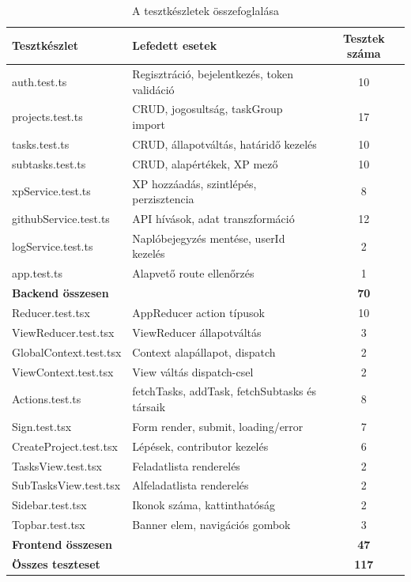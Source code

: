 \begin{table}[h!]
\centering
\caption{A tesztkészletek összefoglalása \cite{jest, vitest}}
\label{tab:test-summary}
\small
\begin{tabularx}{\textwidth}{|l|Y|c|}
\hline
\textbf{Tesztkészlet} & \textbf{Lefedett esetek} & \textbf{Tesztek száma} \\
\hline
auth.test.ts & Regisztráció, bejelentkezés, token validáció & 10 \\
projects.test.ts & CRUD, jogosultság, taskGroup import & 17 \\
tasks.test.ts & CRUD, állapotváltás, határidő kezelés & 10 \\
subtasks.test.ts & CRUD, alapértékek, XP mező & 10 \\
xpService.test.ts & XP hozzáadás, szintlépés, perzisztencia & 8 \\
githubService.test.ts & API hívások, adat transzformáció & 12 \\
logService.test.ts & Naplóbejegyzés mentése, userId kezelés & 2 \\
app.test.ts & Alapvető route ellenőrzés & 1 \\
\hline
\textbf{Backend összesen} & & \textbf{70} \\
\hline
Reducer.test.tsx & AppReducer action típusok & 10 \\
ViewReducer.test.tsx & ViewReducer állapotváltás & 3 \\
GlobalContext.test.tsx & Context alapállapot, dispatch & 2 \\
ViewContext.test.tsx & View váltás dispatch-csel & 2 \\
Actions.test.ts & fetchTasks, addTask, fetchSubtasks és társaik & 8 \\
Sign.test.tsx & Form render, submit, loading/error & 7 \\
CreateProject.test.tsx & Lépések, contributor kezelés & 6 \\
TasksView.test.tsx & Feladatlista renderelés & 2 \\
SubTasksView.test.tsx & Alfeladatlista renderelés & 2 \\
Sidebar.test.tsx & Ikonok száma, kattinthatóság & 2 \\
Topbar.test.tsx & Banner elem, navigációs gombok & 3 \\
\hline
\textbf{Frontend összesen} & & \textbf{47} \\
\hline
\textbf{Összes teszteset} & & \textbf{117} \\
\hline
\end{tabularx}
\end{table}


